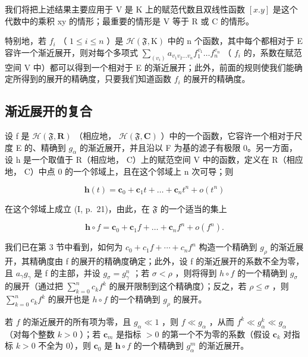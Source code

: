 我们将把上述结果主要应用于 V 是 K 上的赋范代数且双线性函数 \([x.y]\) 是这个代数中的乘积 xy 的情形；最重要的情形是 V 等于 R 或 C 的情形。

特别地，若 \(f_{i}\) （ \(1 \leqslant i \leqslant n\) ）是 \(\mathcal{H}(\mathfrak{F}, \mathrm{K})\) 中的 n 个函数，其中每个都相对于 E 容许一个渐近展开，则对每个多项式 \(\sum_{(v_{i})} a_{v_{1}v_{2}\ldots v_{n}} f_{1}^{v_{1}} \ldots f_{n}^{v_{n}}\) （ \(f_{i}\) 的，系数在赋范空间 V 中）都可以得到一个相对于 E 的渐近展开；此外，前面的规则使我们能确定所得到的展开的精确度，只要我们知道函数 \(f_{i}\) 的展开的精确度。

\subsection{渐近展开的复合}

设 f 是 \(\mathcal{H}(\mathfrak{F},\mathbf{R})\) （相应地， \(\mathcal{H}(\mathfrak{F},\mathbf{C})\) ）中的一个函数，它容许一个相对于尺度 E 的、精确到 \(g_{\alpha}\) 的渐近展开，并且沿以 F 为基的滤子有极限 0。另一方面，设 h 是一个取值于 R（相应地， C）上的赋范空间 V 中的函数，定义在 R（相应地， C）中点 0 的一个邻域上，且在这个邻域上 n 次可导；则

\[
\mathbf {h} (t) = \mathbf {c} _ {0} + \mathbf {c} _ {1} t + \dots + \mathbf {c} _ {n} t ^ {n} + o (t ^ {n})
\]

在这个邻域上成立 (I, p.~21)，由此，在 \(\mathfrak{F}\) 的一个适当的集上

\[
\mathbf {h} \circ f = \mathbf {c} _ {0} + \mathbf {c} _ {1} f + \dots + \mathbf {c} _ {n} f ^ {n} + o (f ^ {n}).
\]

我们已在第 3 节中看到，如何为 \(c_{0} + c_{1}f + \cdots + c_{n}f^{n}\) 构造一个精确到 \(g_{\rho}\) 的渐近展开，其精确度由 f 的展开的精确度确定；此外，设 f 的渐近展开的系数不全为零，且 \(a_{\gamma}g_{\gamma}\) 是 f 的主部，并设 \(g_{\sigma} = g_{\gamma}^{n}\) ；若 \(\sigma < \rho\) ，则将得到 \(h \circ f\) 的一个精确到 \(g_{\sigma}\) 的展开（通过把 \(\sum_{k=0}^{n} c_{k}f^{k}\) 的展开限制到这个精确度）；反之，若 \(\rho \leqslant \sigma\) ，则 \(\sum_{k=0}^{n} c_{k}f^{k}\) 的展开也是 \(h \circ f\) 的一个精确到 \(g_{\rho}\) 的展开。

若 \(f\) 的渐近展开的所有项为零，且 \(g_{\alpha} \ll 1\) ，则 \(f \ll g_{\alpha}\) ，从而 \(f^k \ll g_{\alpha}^k \ll g_{\alpha}\) （对每个整数 \(k > 0\) ）；若 \(\mathbf{c}_m\) 是指标 \(> 0\) 的第一个不为零的系数（假设 \(\mathbf{c}_k\) 对指标 \(k > 0\) 不全为 0），则 \(\mathbf{c}_0\) 是 \(\mathbf{h} \circ f\) 的一个精确到 \(g_{\alpha}^{m}\) 的渐近展开。


